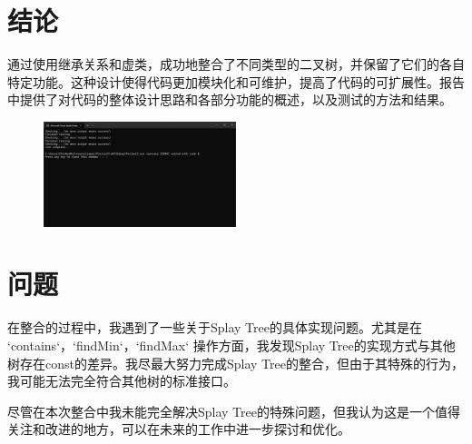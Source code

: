 \documentclass{ctexart}
\begin{document}
\section{结论}
通过使用继承关系和虚类，成功地整合了不同类型的二叉树，并保留了它们的各自特定功能。这种设计使得代码更加模块化和可维护，提高了代码的可扩展性。报告中提供了对代码的整体设计思路和各部分功能的概述，以及测试的方法和结果。

\begin{figure}
\includegraphics[width=0.5\textwidth]{image.png}
\end{figure}

\section{问题}
在整合的过程中，我遇到了一些关于Splay Tree的具体实现问题。尤其是在 `contains`，`findMin`，`findMax` 操作方面，我发现Splay Tree的实现方式与其他树存在const的差异。我尽最大努力完成Splay Tree的整合，但由于其特殊的行为，我可能无法完全符合其他树的标准接口。

尽管在本次整合中我未能完全解决Splay Tree的特殊问题，但我认为这是一个值得关注和改进的地方，可以在未来的工作中进一步探讨和优化。
    
\end{document}
